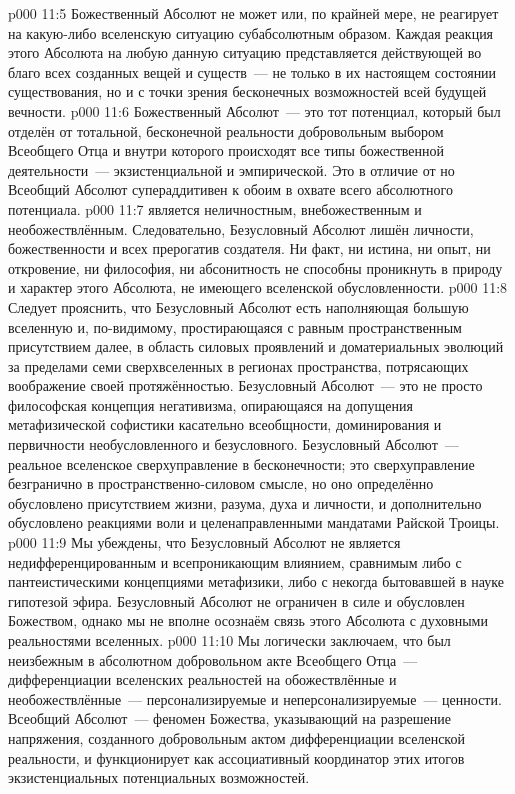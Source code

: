 \vs p000 11:5 Божественный Абсолют не может или, по крайней мере, не реагирует на какую\hyp{}либо вселенскую ситуацию субабсолютным образом. Каждая реакция этого Абсолюта на любую данную ситуацию представляется действующей во благо всех созданных вещей и существ~--- не только в их настоящем состоянии существования, но и с точки зрения бесконечных возможностей всей будущей вечности.
\vs p000 11:6 Божественный Абсолют~--- это тот потенциал, который был отделён от тотальной, бесконечной реальности добровольным выбором Всеобщего Отца и внутри которого происходят все типы божественной деятельности~--- экзистенциальной и эмпирической. Это  в отличие от  но Всеобщий Абсолют супераддитивен к обоим в охвате всего абсолютного потенциала.
\vs p000 11:7 \pc {} является неличностным, внебожественным и необожествлённым. Следовательно, Безусловный Абсолют лишён личности, божественности и всех прерогатив создателя. Ни факт, ни истина, ни опыт, ни откровение, ни философия, ни абсонитность не способны проникнуть в природу и характер этого Абсолюта, не имеющего вселенской обусловленности.
\vs p000 11:8 Следует прояснить, что Безусловный Абсолют есть  наполняющая большую вселенную и, по\hyp{}видимому, простирающаяся с равным пространственным присутствием далее, в область силовых проявлений и доматериальных эволюций за пределами семи сверхвселенных в регионах пространства, потрясающих воображение своей протяжённостью. Безусловный Абсолют~--- это не просто философская концепция негативизма, опирающаяся на допущения метафизической софистики касательно всеобщности, доминирования и первичности необусловленного и безусловного. Безусловный Абсолют~--- реальное вселенское сверхуправление в бесконечности; это сверхуправление безгранично в пространственно\hyp{}силовом смысле, но оно определённо обусловлено присутствием жизни, разума, духа и личности, и дополнительно обусловлено реакциями воли и целенаправленными мандатами Райской Троицы.
\vs p000 11:9 Мы убеждены, что Безусловный Абсолют не является недифференцированным и всепроникающим влиянием, сравнимым либо с пантеистическими концепциями метафизики, либо с некогда бытовавшей в науке гипотезой эфира. Безусловный Абсолют не ограничен в силе и обусловлен Божеством, однако мы не вполне осознаём связь этого Абсолюта с духовными реальностями вселенных.
\vs p000 11:10 \pc {}Мы логически заключаем, что  был неизбежным в абсолютном добровольном акте Всеобщего Отца~--- дифференциации вселенских реальностей на обожествлённые и необожествлённые~--- персонализируемые и неперсонализируемые~--- ценности. Всеобщий Абсолют~--- феномен Божества, указывающий на разрешение напряжения, созданного добровольным актом дифференциации вселенской реальности, и функционирует как ассоциативный координатор этих итогов экзистенциальных потенциальных возможностей.

